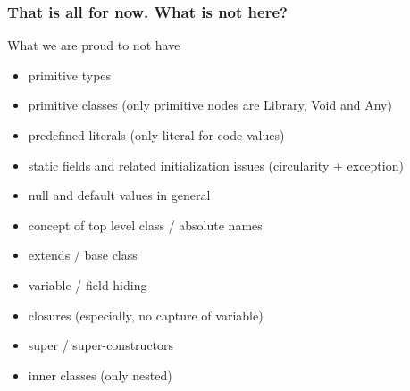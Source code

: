 %


\begin{frame}[fragile]
\frametitle{That is all for now. What is \textbf{not} here?}
What we are proud to not have
\begin{itemize}
\item primitive types
\item primitive classes (only primitive nodes are Library, Void and Any)
\item predefined literals (only literal for code values)
\item static fields and related initialization issues (circularity + exception)
\item null and default values in general
\item concept of top level class / absolute names
\item extends / base class
\item variable / field hiding
\item closures (especially, no capture of variable)
\item super / super-constructors
\item inner classes (only nested)
\end{itemize}

\end{frame}


